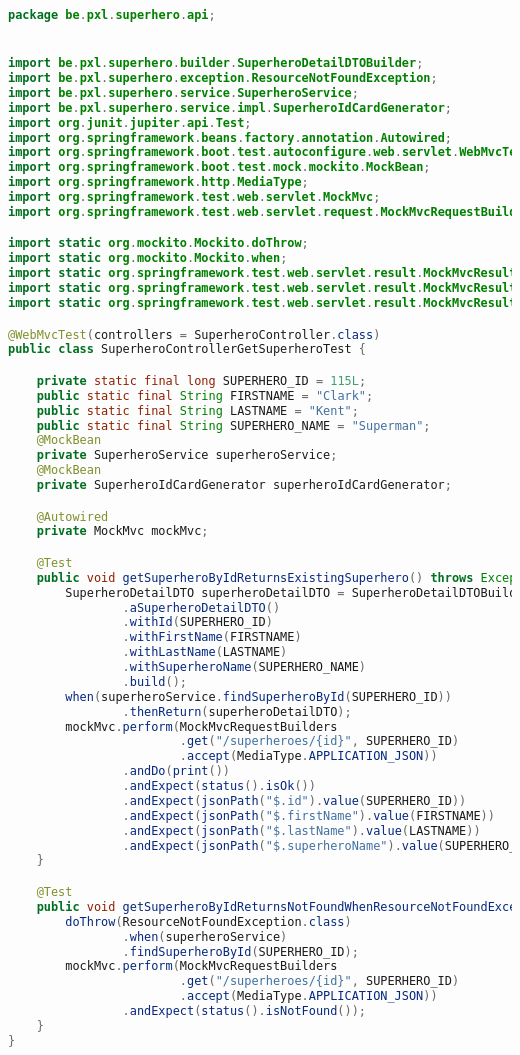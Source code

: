 \begin{lstlisting}[language=java, frame=single]
package be.pxl.superhero.api;


import be.pxl.superhero.builder.SuperheroDetailDTOBuilder;
import be.pxl.superhero.exception.ResourceNotFoundException;
import be.pxl.superhero.service.SuperheroService;
import be.pxl.superhero.service.impl.SuperheroIdCardGenerator;
import org.junit.jupiter.api.Test;
import org.springframework.beans.factory.annotation.Autowired;
import org.springframework.boot.test.autoconfigure.web.servlet.WebMvcTest;
import org.springframework.boot.test.mock.mockito.MockBean;
import org.springframework.http.MediaType;
import org.springframework.test.web.servlet.MockMvc;
import org.springframework.test.web.servlet.request.MockMvcRequestBuilders;

import static org.mockito.Mockito.doThrow;
import static org.mockito.Mockito.when;
import static org.springframework.test.web.servlet.result.MockMvcResultHandlers.print;
import static org.springframework.test.web.servlet.result.MockMvcResultMatchers.jsonPath;
import static org.springframework.test.web.servlet.result.MockMvcResultMatchers.status;

@WebMvcTest(controllers = SuperheroController.class)
public class SuperheroControllerGetSuperheroTest {

	private static final long SUPERHERO_ID = 115L;
	public static final String FIRSTNAME = "Clark";
	public static final String LASTNAME = "Kent";
	public static final String SUPERHERO_NAME = "Superman";
	@MockBean
	private SuperheroService superheroService;
	@MockBean
	private SuperheroIdCardGenerator superheroIdCardGenerator;

	@Autowired
	private MockMvc mockMvc;

	@Test
	public void getSuperheroByIdReturnsExistingSuperhero() throws Exception {
		SuperheroDetailDTO superheroDetailDTO = SuperheroDetailDTOBuilder
				.aSuperheroDetailDTO()
				.withId(SUPERHERO_ID)
				.withFirstName(FIRSTNAME)
				.withLastName(LASTNAME)
				.withSuperheroName(SUPERHERO_NAME)
				.build();
		when(superheroService.findSuperheroById(SUPERHERO_ID))
				.thenReturn(superheroDetailDTO);
		mockMvc.perform(MockMvcRequestBuilders
						.get("/superheroes/{id}", SUPERHERO_ID)
						.accept(MediaType.APPLICATION_JSON))
				.andDo(print())
				.andExpect(status().isOk())
				.andExpect(jsonPath("$.id").value(SUPERHERO_ID))
				.andExpect(jsonPath("$.firstName").value(FIRSTNAME))
				.andExpect(jsonPath("$.lastName").value(LASTNAME))
				.andExpect(jsonPath("$.superheroName").value(SUPERHERO_NAME));
	}

	@Test
	public void getSuperheroByIdReturnsNotFoundWhenResourceNotFoundExceptionIsThrown() throws Exception {
		doThrow(ResourceNotFoundException.class)
				.when(superheroService)
				.findSuperheroById(SUPERHERO_ID);
		mockMvc.perform(MockMvcRequestBuilders
						.get("/superheroes/{id}", SUPERHERO_ID)
						.accept(MediaType.APPLICATION_JSON))
				.andExpect(status().isNotFound());
	}
}
\end{lstlisting}


